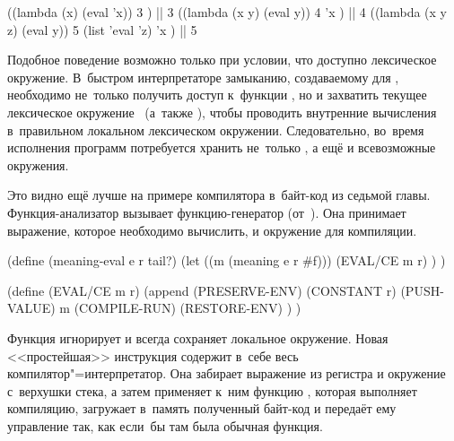 \begin{code:lisp}
((lambda (x) (eval 'x))
 3 )                       |\is| 3
((lambda (x y) (eval y))
 4 'x )                    |\is| 4
((lambda (x y z) (eval y))
 5 (list 'eval 'z) 'x )    |\is| 5
\end{code:lisp}

Подобное поведение возможно только при условии, что  доступно
лексическое окружение. В~быстром интерпретаторе замыканию, создаваемому
 для , необходимо не~только получить доступ к~функции
, но и захватить текущее лексическое окружение~ (а~также
), чтобы проводить внутренние вычисления в~правильном локальном
лексическом окружении. Следовательно, во~время исполнения программ потребуется
хранить не~только , а ещё и всевозможные окружения.

Это видно ещё лучше на примере компилятора в~байт-код из седьмой главы.
 Функция-анализатор  вызывает
функцию-генератор  (от~).
Она принимает выражение, которое необходимо вычислить, и окружение для
компиляции.

\begin{code:lisp}
(define (meaning-eval e r tail?)
  (let ((m (meaning e r #f)))
    (EVAL/CE m r) ) )

(define (EVAL/CE m r)
  (append (PRESERVE-ENV) (CONSTANT r) (PUSH-VALUE)
          m (COMPILE-RUN) (RESTORE-ENV) ) )
\end{code:lisp}

Функция  игнорирует  и всегда сохраняет локальное
окружение. Новая <<простейшая>> инструкция  содержит в~себе
весь компилятор"=интерпретатор. Она забирает выражение из регистра  и
окружение с~верхушки стека, а затем применяет к~ним функцию
, которая выполняет компиляцию, загружает в~память
полученный байт-код и передаёт ему управление так, как если~бы там была обычная
функция.

